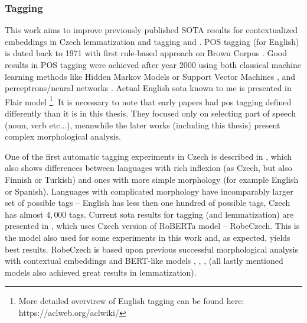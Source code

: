 \subsubsection{Tagging}
This work aims to improve previously published SOTA results for contextualized embeddings in Czech lemmatization and tagging \citep{straka2019czech} and \citep{Straka2021}. POS tagging (for English) is dated back to 1971 with first rule-based approach on Brown Corpus \citep{greene1971automatic}. Good results in POS tagging were achieved after year 2000 using both classical machine learning methods like Hidden Markov Models \citep{tnt} or Support Vector Machines \citep{svmtool}, and perceptrons/neural networks \citep{collins-2002-discriminative}. Actual English \acrshort{sota} known to me is presented in Flair model \citep{Akbik2018}\footnote{More detailed overvirew of English tagging can be found here: https://aclweb.org/aclwiki/}. It is necessary to note that early papers had \acrshort{pos} tagging defined differently than it is in this thesis. They focused only on selecting part of speech (noun, verb etc...), meanwhile the later works (including this thesis) present complex morphological analysis.
\par
One of the first automatic tagging experiments in Czech is described in \citep{Hladka}, which also shows differences between languages with rich inflexion (as Czech,  but also Finnish or Turkish) and ones with more simple morphology (for example English or Spanish). Languages with complicated morphology have incomparably larger set of possible tags -- English has less then one hundred of possible tags, Czech has almost $4,000$ tags.  Current \acrshort{sota} results for tagging (and lemmatization) are presented in \citep{Straka2021}, which uses Czech version of RoBERTa model -- RobeCzech. This is the model also used for some experiments in this work and, as expected,  yields best results. RobeCzech is based upon previous successful morphological analysis with contextual embeddings and BERT-like models \citep{Straka2019b}, \citep{Straka2019a}, \citep{Straka2019}, \citep{Straka2018} (all lastly mentioned models also achieved great results in lemmatization). \par
